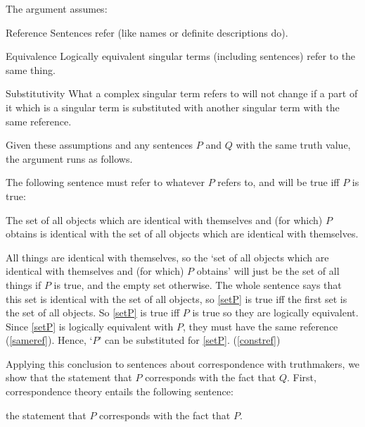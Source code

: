 The argument assumes:
\parencite[753]{Davidson_1969}

	\begin{principle}{Reference}\label{srefer}
	Sentences refer (like names or definite descriptions do).
	\end{principle}

	\begin{principle}{Equivalence}\label{sameref}
	Logically equivalent singular terms (including sentences) refer to the same thing.
	\end{principle}

	\begin{principle}{Substitutivity}\label{constref}
	What a complex singular term refers to will not change if a part of it which is a singular term is substituted with another singular term with the same reference.
	\end{principle}

Given these assumptions and any sentences $P$ and $Q$ with the same truth value, the argument runs as follows.

The following sentence must refer to whatever $P$ refers to, and will be true iff $P$ is true:

	\begin{example}\label{setP}
	The set of all objects which are identical with themselves and (for which) $P$ obtains is identical with the set of all objects which are identical with themselves.
	\end{example}

All things are identical with themselves, so the `set of all objects which are identical with themselves and (for which) $P$ obtains' will just be the set of all things if $P$ is true, and the empty set otherwise.
The whole sentence says that this set is identical with the set of all objects, so \ref{setP} is true iff the first set is the set of all objects.
So \ref{setP} is true iff $P$ is true so they are logically equivalent.
Since \ref{setP} is logically equivalent with $P$, they must have the same reference (\ref{sameref}).
Hence, `$P$' can be substituted for \ref{setP}.
(\ref{constref})

Applying this conclusion to sentences about correspondence with truthmakers, we show that the statement that $P$ corresponds with the fact that $Q$.
First, correspondence theory entails the following sentence:

	\begin{example}\label{stateP}
	the statement that $P$ corresponds with the fact that $P$.
	\end{example}

